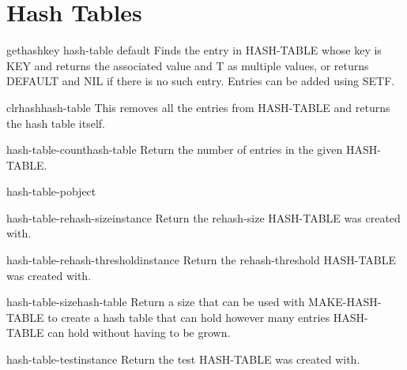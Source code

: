 \chapter{Hash Tables}

\begin{accessor}{gethash}{key hash-table \op default}
  Finds the entry in HASH-TABLE whose key is KEY and returns the
associated value and T as multiple values, or returns DEFAULT and NIL
if there is no such entry. Entries can be added using SETF.
\end{accessor}

\begin{function}{clrhash}{hash-table}
  This removes all the entries from HASH-TABLE and returns the hash
table itself.
\end{function}

\begin{function}{hash-table-count}{hash-table}
  Return the number of entries in the given HASH-TABLE.
\end{function}

\begin{function}{hash-table-p}{object}
  
\end{function}

\begin{function}{hash-table-rehash-size}{instance}
  Return the rehash-size HASH-TABLE was created with.
\end{function}

\begin{function}{hash-table-rehash-threshold}{instance}
  Return the rehash-threshold HASH-TABLE was created with.
\end{function}

\begin{function}{hash-table-size}{hash-table}
  Return a size that can be used with MAKE-HASH-TABLE to create a hash
   table that can hold however many entries HASH-TABLE can hold without
   having to be grown.
\end{function}

\begin{function}{hash-table-test}{instance}
  Return the test HASH-TABLE was created with.
\end{function}

